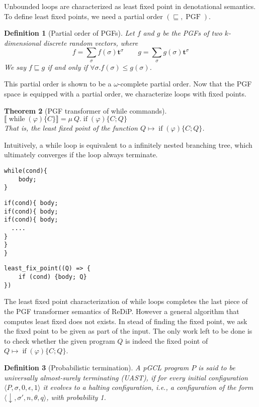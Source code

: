 \documentclass[a4paper]{article}
\DeclareMathOperator*{\PGF}{PGF}
\renewcommand{\S}[1]{ \llbracket #1 \rrbracket }
\newtheorem{theorem}{Theorem}[section]
\newtheorem{definition}[theorem]{Definition}
\begin{document}
Unbounded loops are characterized as least fixed point in denotational semantics.
To define least fixed points, we need a partial order \((\sqsubseteq, \PGF)\).
\begin{definition}[Partial order of PGFs]
	Let \(f\) and \(g\) be the PGFs of two \(k\)-dimensional discrete random vectors, where
	\[
		f = \sum_{\sigma} f(\sigma) \mathbf{t}^\sigma
		\qquad
		g = \sum_{\sigma} g(\sigma) \mathbf{t}^\sigma
	\]
	We say \(f \sqsubseteq g\) if and only if \(\forall \sigma . f(\sigma) \leq g(\sigma)\).
\end{definition}
This partial order is shown to be a \(\omega\)-complete partial order\cite{cav-extended}.
Now that the PGF space is equipped with a partial order, we characterize loops with fixed points.
\begin{theorem}[PGF transformer of while commands]
	\(\S{\operatorname{while}(\varphi)\{C\}} = \mu\ Q . \operatorname{if}(\varphi)\{C;Q\}\)\\
	That is, the least fixed point of the function \(Q \mapsto \operatorname{if}(\varphi)\{C;Q\}\).
\end{theorem}
Intuitively, a while loop is equivalent to a infinitely nested branching tree, which ultimately converges if the loop always terminate.
\begin{tcolorbox} \begin{verbatim}
while(cond){
    body;
}\end{verbatim}
\end{tcolorbox}

\begin{tcolorbox} \begin{verbatim}
if(cond){ body;
if(cond){ body;
if(cond){ body;
  ....
}
}
}
\end{verbatim}
\end{tcolorbox}

\begin{tcolorbox} \begin{verbatim}
least_fix_point((Q) => {
    if (cond) {body; Q}
})
\end{verbatim}
\end{tcolorbox}

The least fixed point characterization of while loops completes the last piece of the PGF transformer semantics of ReDiP.
However a general algorithm that computes least fixed does not exists.
In stead of finding the fixed point, we ask the fixed point to be given as part of the input.
The only work left to be done is to check whether the given program \(Q\) is indeed the fixed point of \(Q\mapsto \operatorname{if}(\varphi)\{C;Q\}\).
\begin{definition}[Probabilistic termination]
	A pGCL program \(P\) is said to be universally almost-surely terminating (UAST),
	if for every initial configuration \(\langle P,\sigma,0,\epsilon,1 \rangle\) it evolves to a halting configuration, i.e., a configuration of the form \(\langle \downarrow, \sigma', n,\theta,q\rangle\), with probability 1.
\end{definition}
\end{document}
